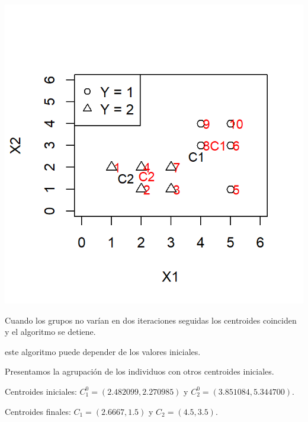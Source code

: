 \begin{center}
\includegraphics[width=0.5\linewidth]{"Temas/Imágenes/Tema 6/screenshot004"}
\end{center}
Cuando los grupos no varían en dos iteraciones seguidas los centroides coinciden y el algoritmo se detiene.

 este algoritmo puede depender de los valores iniciales.

Presentamos la agrupación de los individuos con otros centroides iniciales.

Centroides iniciales: $C_1^0=(2.482099,2.270985)$ y $C_2^0=(3.851084,5.344700)$.

Centroides finales: $C_1=(2.6667,1.5)$ y $C_2=(4.5,3.5)$.


